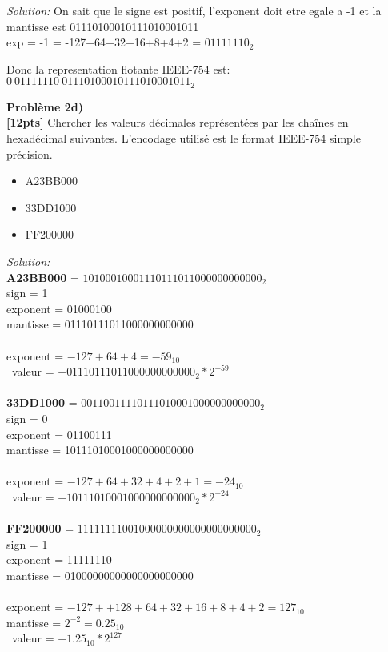\documentclass{article}
\newenvironment{problem}[2][Problème]
    { \begin{mdframed}[backgroundcolor=gray!20] \textbf{#1 #2} \\}
    {  \end{mdframed}}
\newenvironment{solution}
    {\textit{Solution:}}
    {}
\begin{document}
\begin{solution}
    On sait que le signe est positif, l'exponent doit etre egale a -1 et la mantisse est 01110100010111010001011\\

    exp = -1 = -127+64+32+16+8+4+2 = $01111110_2$

    Donc la representation flotante IEEE-754 est: \\
    $0\ 01111110\ 01110100010111010001011_2$ 
\end{solution}


\begin{problem}{2d)}
\textbf{[12pts]} Chercher les valeurs décimales représentées par les chaînes en hexadécimal
suivantes. L’encodage utilisé est le format IEEE-754 simple précision.
\begin{itemize}
    \item A23BB000
    \item 33DD1000
    \item FF200000
\end{itemize}
\end{problem}

\begin{solution}
    \\
    \textbf{A23BB000} = $1010 0010 0011 1011 1011 0000 0000 0000_2$ \\
    sign = 1 \\
    exponent = 01000100 \\
    mantisse = 01110111011000000000000 \\
    \\
    exponent = $-127 + 64 + 4 = -59_{10}$ \\
    \
    valeur = $- 01110111011000000000000_2 * 2^{-59}$
    \\\\
    \textbf{33DD1000} = $0011 0011 1101 1101 0001 0000 0000 0000_2$ \\
    sign = 0 \\
    exponent = 01100111 \\
    mantisse = 10111010001000000000000 \\
    \\
    exponent = $-127 + 64 + 32 + 4 + 2 + 1 = -24_{10}$ \\
    \
    valeur = $+ 10111010001000000000000_2 * 2^{-24}$
    \\\\
    \textbf{FF200000} = $1111 1111 0010 0000 0000 0000 0000 0000_2$ \\
    sign = 1 \\
    exponent = 11111110 \\
    mantisse = 01000000000000000000000 \\
    \\
    exponent = $-127 + + 128 + 64 + 32 + 16 + 8 + 4 + 2 = 127_{10}$ \\
    mantisse = $2^{-2} = 0.25_{10}$ \\
    \
    valeur = $- 1.25_{10} * 2^{127}$
\end{solution}
\end{document}
